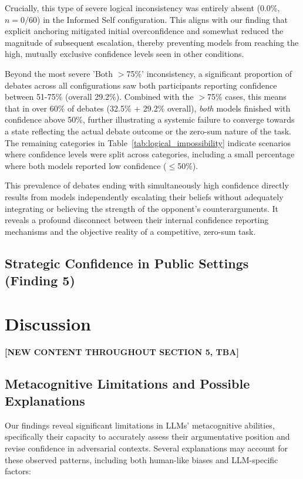 \documentclass{article}
\begin{document}
Crucially, this type of severe logical inconsistency was entirely absent (0.0\%, $n=0/60$) in the Informed Self configuration. This aligns with our finding that explicit anchoring mitigated initial overconfidence and somewhat reduced the magnitude of subsequent escalation, thereby preventing models from reaching the high, mutually exclusive confidence levels seen in other conditions.

Beyond the most severe 'Both $>$75\%' inconsistency, a significant proportion of debates across all configurations saw both participants reporting confidence between 51-75\% (overall 29.2\%). Combined with the $>$75\% cases, this means that in over 60\% of debates (32.5\% + 29.2\% overall), \emph{both} models finished with confidence above 50\%, further illustrating a systemic failure to converge towards a state reflecting the actual debate outcome or the zero-sum nature of the task. The remaining categories in Table~\ref{tab:logical_impossibility} indicate scenarios where confidence levels were split across categories, including a small percentage where both models reported low confidence ($\le$50\%).

This prevalence of debates ending with simultaneously high confidence directly results from models independently escalating their beliefs without adequately integrating or believing the strength of the opponent's counterarguments. It reveals a profound disconnect between their internal confidence reporting mechanisms and the objective reality of a competitive, zero-sum task.




\subsection{Strategic Confidence in Public Settings (Finding 5)}




\section{Discussion}
\textbf{[NEW CONTENT THROUGHOUT SECTION 5, TBA]}


\subsection{Metacognitive Limitations and Possible Explanations}
\label{subsec:metacognitive_limitations}

Our findings reveal significant limitations in LLMs' metacognitive abilities, specifically their capacity to accurately assess their argumentative position and revise confidence in adversarial contexts. Several explanations may account for these observed patterns, including both human-like biases and LLM-specific factors:
\end{document}
